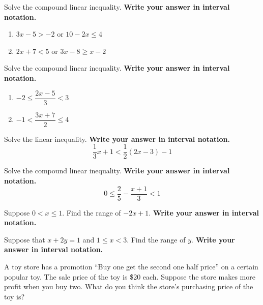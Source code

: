 \documentclass[en,11pt]{latex/elegantbookr}
\providecommand{\tightlist}{%
  \setlength{\itemsep}{0pt}\setlength{\parskip}{0pt}}
\theoremstyle{definition}
\theoremstyle{definition}
\theoremstyle{definition}
\theoremstyle{remark}
\let\BeginKnitrBlock\begin \let\EndKnitrBlock\end
\begin{document}
\BeginKnitrBlock{exercise}
\protect\hypertarget{exr:unnamed-chunk-25}{}{\label{exr:unnamed-chunk-25} }Solve the compound linear inequality. \textbf{Write your answer in interval notation.}

\begin{enumerate}
\def\labelenumi{\arabic{enumi}.}
\tightlist
\item
  \(3x-5>-2\) or \(10-2x\leq 4\)
\item
  \(2x + 7<5\) or \(3x-8\geq x-2\)
\end{enumerate}
\EndKnitrBlock{exercise}

\BeginKnitrBlock{exercise}
\protect\hypertarget{exr:unnamed-chunk-26}{}{\label{exr:unnamed-chunk-26} }Solve the compound linear inequality. \textbf{Write your answer in interval notation.}

\begin{enumerate}
\def\labelenumi{\arabic{enumi}.}
\tightlist
\item
  \(-2\leq \dfrac{2x-5}{3}<3\)
\item
  \(-1< \dfrac{3x+7}{2}\leq 4\)
\end{enumerate}
\EndKnitrBlock{exercise}

\BeginKnitrBlock{exercise}
\protect\hypertarget{exr:unnamed-chunk-27}{}{\label{exr:unnamed-chunk-27} }Solve the linear inequality. \textbf{Write your answer in interval notation.}
\[
\frac13x+1<\frac12(2x-3)-1
\]
\EndKnitrBlock{exercise}

\BeginKnitrBlock{exercise}
\protect\hypertarget{exr:unnamed-chunk-28}{}{\label{exr:unnamed-chunk-28} }Solve the compound linear inequality. \textbf{Write your answer in interval notation.}
\[
0\le \frac25-\frac{x+1}{3}< 1
\]
\EndKnitrBlock{exercise}

\BeginKnitrBlock{exercise}
\protect\hypertarget{exr:unnamed-chunk-29}{}{\label{exr:unnamed-chunk-29} }Suppose \(0< x \le 1\). Find the range of \(-2x+1\). \textbf{Write your answer in interval notation.}
\EndKnitrBlock{exercise}

\BeginKnitrBlock{exercise}
\protect\hypertarget{exr:unnamed-chunk-30}{}{\label{exr:unnamed-chunk-30} }Suppose that \(x+2y=1\) and \(1\leq x< 3\). Find the range of \(y\). \textbf{Write your answer in interval notation.}
\EndKnitrBlock{exercise}

\BeginKnitrBlock{exercise}
\protect\hypertarget{exr:unnamed-chunk-31}{}{\label{exr:unnamed-chunk-31} }A toy store has a promotion ``Buy one get the second one half price'' on a certain popular toy. The sale price of the toy is \$20 each. Suppose the store makes more profit when you buy two. What do you think the store's purchasing price of the toy is?
\EndKnitrBlock{exercise}


\end{document}
